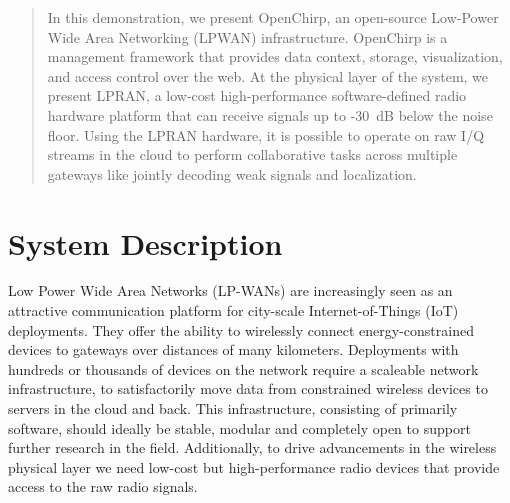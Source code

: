 \documentclass[conference]{IEEEtran}
\begin{document}




\maketitle

\begin{abstract}

In this demonstration, we present OpenChirp, an open-source Low-Power Wide Area Networking (LPWAN) infrastructure. OpenChirp is a management framework that provides data context, storage, visualization, and access control over the web.  At the physical layer of the system,  we  present LPRAN, a low-cost high-performance software-defined radio hardware platform that can receive signals up to -30~dB below the noise floor. Using the LPRAN hardware, it is possible to operate on raw I/Q streams in the cloud to perform collaborative tasks across multiple gateways like jointly decoding weak signals and localization. 

\end{abstract}

\IEEEpeerreviewmaketitle


\section{System Description}
\label{sec:system}

Low Power Wide Area Networks (LP-WANs) are increasingly seen as an attractive
communication platform for city-scale Internet-of-Things (IoT) deployments.
They offer the ability to wirelessly connect energy-constrained devices to
gateways over distances of many kilometers. Deployments with hundreds or
thousands of devices on the network require a scaleable network
infrastructure, to satisfactorily move data from constrained wireless devices
to servers in the cloud and back. This infrastructure, consisting of primarily
software, should ideally be stable, modular and completely open to support
further research in the field. Additionally, to drive advancements in the
wireless physical layer we need low-cost but high-performance radio devices
that provide access to the raw radio signals.
\end{document}
